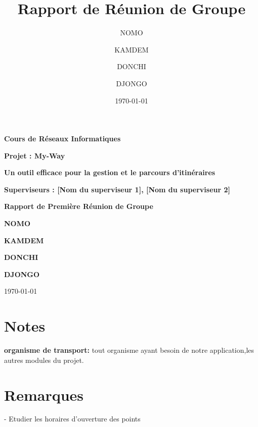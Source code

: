 \documentclass{article}
\title{Rapport de Réunion de Groupe}
\author{NOMO \and KAMDEM \and DONCHI \and DJONGO}
\date{\today}
\begin{document}
\begin{titlepage}
    \centering
    \vspace*{1cm}
    \Large\textbf{Cours de Réseaux Informatiques}\par
    \vspace{0.5cm}
    \Large\textbf{Projet : My-Way}\par
    \vspace{0.5cm}
    \Large\textbf{Un outil efficace pour la gestion et le parcours d'itinéraires}\par
    \vspace{1cm}
    \textbf{Superviseurs : [Nom du superviseur 1], [Nom du superviseur 2]}\par
    \vspace{1cm}
    \Large\textbf{Rapport de Première Réunion de Groupe}\par
    \vspace{1cm}
    \textbf{NOMO}\par
    \textbf{KAMDEM}\par
    \textbf{DONCHI}\par
    \textbf{DJONGO}\par
    \vspace{1cm}
    \today\par
    \vfill
\end{titlepage}

\tableofcontents
\clearpage

\section{}


\section{Notes}
\textbf{organisme de transport:}
tout organisme ayant besoin de notre application,les autres modules du projet.

\section{Remarques}

- Etudier les horaires d'ouverture des points
\end{document}

